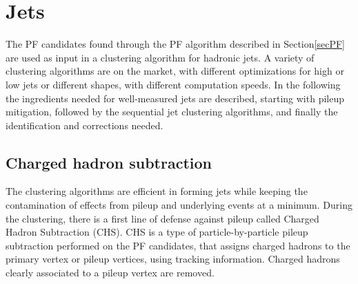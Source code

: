 \section{Jets}
The PF candidates found through the PF algorithm described in Section\ref{secPF} are used as input in a clustering algorithm for hadronic jets. 
A variety of clustering algorithms are on the market, with different optimizations for high or low \pt jets or different shapes, with different computation speeds. 
In the following the ingredients needed for well-measured jets are described, starting with pileup mitigation, followed by the sequential jet clustering algorithms, and finally the identification and corrections needed. 
\subsection{Charged hadron subtraction}
The clustering algorithms are efficient in forming jets while keeping the contamination of effects from pileup and underlying events at a minimum.
During the clustering, there is a first line of defense against pileup called Charged Hadron Subtraction (CHS). 
CHS is a type of particle-by-particle pileup subtraction performed on the PF candidates, that assigns charged hadrons to the primary vertex or pileup vertices, using tracking information. 
Charged hadrons clearly associated to a pileup vertex are removed. 
